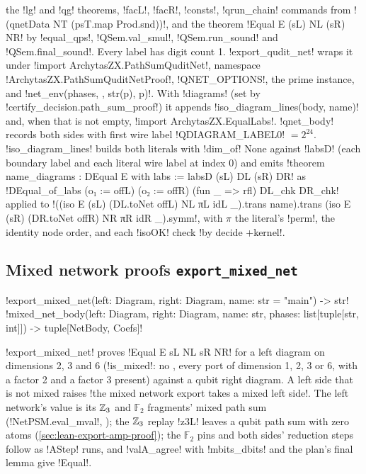 {{{the \lexlean!lg! and \lexlean!qg! theorems, \lexlean!facL!, \lexlean!facR!, \lexlean!consts!,
\lexlean!qrun_chain! commands from \lexlean!(qnetData NT (psT.map Prod.snd))!, and the theorem
\lexlean!Equal E (sL) NL (sR) NR! by \lexlean!equal_qps!, \lexlean!QSem.val_smul!,
\lexlean!QSem.run_sound! and \lexlean!QSem.final_sound!. Every label has digit count 1.
\lexpy!export_qudit_net! wraps it under \lexlean!import ArchytasZX.PathSumQuditNet!, namespace
\lexlean!ArchytasZX.PathSumQuditNetProof!, \lexpy!QNET_OPTIONS!, the prime instance, and
\lexpy!net_env(phases, {}, str(p), p)!. With \py!diagrams! (set by
\py!certify_decision.path_sum_proof!) it appends \py!iso_diagram_lines(body, name)! and, when that
is not empty, \lexlean!import ArchytasZX.EqualLabs!. \py!qnet_body! records both sides with first
wire label \py!QDIAGRAM_LABEL0! $=2^{24}$. \py!iso_diagram_lines! builds both literals with
\py!dim_of! None against \lexlean!labsD! (each boundary label and each literal wire label at index 0)
and emits \lexlean!theorem name_diagrams : DEqual { E with labs := labsD } (sL) DL (sR) DR! as
\lexlean!DEqual_of_labs (o₁ := offL) (o₂ := offR) (fun _ => rfl) DL_chk DR_chk! applied to
\lexlean!((iso E (sL) (DL.toNet offL) NL πL idL _).trans name).trans (iso E (sR) (DR.toNet offR) NR πR idR _).symm!,
with $\pi$ the literal's \py!perm!, the identity node order, and each \lexlean!isoOK! check
\lexlean!by decide +kernel!.

\subsection{Mixed network proofs \texttt{export\_mixed\_net}}\label{sec:lean-export-mixed}

\begin{signature}
\lexpy!export_mixed_net(left: Diagram, right: Diagram, name: str = "main") -> str!\\
\lexpy!mixed_net_body(left: Diagram, right: Diagram, name: str, phases: list[tuple[str, int]]) -> tuple[NetBody, Coefs]!
\end{signature}
\lexpy!export_mixed_net! proves \lexlean!Equal E sL NL sR NR! for a left diagram on dimensions 2, 3
and 6 (\lexpy!is_mixed!: no \bboxes, every port of dimension 1, 2, 3 or 6, with a factor 2 and a
factor 3 present) against a qubit right diagram. A left side that is not mixed raises
\lexcode!the mixed network export takes a mixed left side!. The left network's value is its
$\mathbb{Z}_3$ and $\mathbb{F}_2$ fragments' mixed path sum (\lexlean!NetPSM.eval_mval!,
); the $\mathbb{Z}_3$ replay \lexlean!z3L! leaves a qubit path sum
with zero atoms (\cref{sec:lean-export-amp-proof}); the $\mathbb{F}_2$ pins and both sides'
reduction steps follow as \lexlean!AStep! runs, and \lexlean!valA_agree! with \lexlean!mbits_dbits! and
the plan's final lemma give \lexlean!Equal!.

}}}
